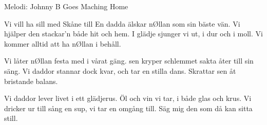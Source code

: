 \begin{song}

\begin{songmeta}
Melodi: Johnny B Goes Maching Home
\end{songmeta}
\begin{songtext}
Vi vill ha sill med Skåne till
En dadda älskar nØllan som sin bäste vän.
Vi hjälper den stackar'n både hit och hem.
I glädje sjunger vi ut,
i dur och i moll.
Vi kommer alltid att ha nØllan i behåll.

Vi låter nØllan festa med i vårat gäng.
sen kryper schlemmet sakta åter till sin säng.
Vi daddor stannar dock kvar,
och tar en stilla dans.
Skrattar sen åt bristande balans.

Vi daddor lever livet i ett glädjerus.
Öl och vin vi tar, i både glas och krus.
Vi dricker ur till sång en sup,
vi tar en omgång till.
Säg mig den som då kan sitta still.

\end{songtext}
\end{song}
